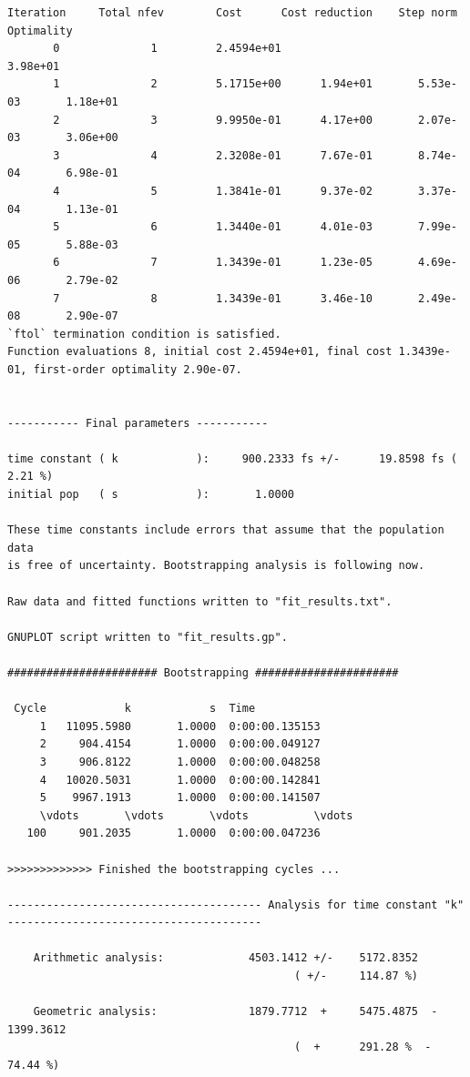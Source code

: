 \documentclass[a4paper,11pt,DIV=15,openany]{scrbook}
\begin{document}
\begin{oframed}
\begin{Verbatim}[commandchars=\\\{\}]
   Iteration     Total nfev        Cost      Cost reduction    Step norm     Optimality   
       0              1         2.4594e+01                                    3.98e+01    
       1              2         5.1715e+00      1.94e+01       5.53e-03       1.18e+01    
       2              3         9.9950e-01      4.17e+00       2.07e-03       3.06e+00    
       3              4         2.3208e-01      7.67e-01       8.74e-04       6.98e-01    
       4              5         1.3841e-01      9.37e-02       3.37e-04       1.13e-01    
       5              6         1.3440e-01      4.01e-03       7.99e-05       5.88e-03    
       6              7         1.3439e-01      1.23e-05       4.69e-06       2.79e-02    
       7              8         1.3439e-01      3.46e-10       2.49e-08       2.90e-07    
`ftol` termination condition is satisfied.
Function evaluations 8, initial cost 2.4594e+01, final cost 1.3439e-01, first-order optimality 2.90e-07.


----------- Final parameters -----------

time constant ( k            ):     900.2333 fs +/-      19.8598 fs (   2.21 %)
initial pop   ( s            ):       1.0000

These time constants include errors that assume that the population data
is free of uncertainty. Bootstrapping analysis is following now.

Raw data and fitted functions written to "fit_results.txt".

GNUPLOT script written to "fit_results.gp".

####################### Bootstrapping ######################

 Cycle            k            s  Time
     1   11095.5980       1.0000  0:00:00.135153
     2     904.4154       1.0000  0:00:00.049127
     3     906.8122       1.0000  0:00:00.048258
     4   10020.5031       1.0000  0:00:00.142841
     5    9967.1913       1.0000  0:00:00.141507
     \vdots       \vdots       \vdots          \vdots
   100     901.2035       1.0000  0:00:00.047236

>>>>>>>>>>>>> Finished the bootstrapping cycles ...

--------------------------------------- Analysis for time constant "k" ---------------------------------------

    Arithmetic analysis:             4503.1412 +/-    5172.8352
                                            ( +/-     114.87 %)

    Geometric analysis:              1879.7712  +     5475.4875  -     1399.3612
                                            (  +      291.28 %  -       74.44 %)


\end{Verbatim}
\end{oframed}
\end{document}
